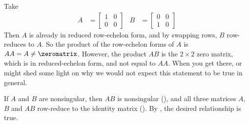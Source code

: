 Take 
%
\begin{align*}
A&=
\begin{bmatrix}
1&0\\0&0
\end{bmatrix}
&
B&=
\begin{bmatrix}
0&0\\1&0
\end{bmatrix}
\end{align*}
%
Then $A$ is already in reduced row-echelon form, and by swapping rows, $B$ row-reduces to $A$.  So the product of the row-echelon forms of $A$ is $AA=A\neq\zeromatrix$.  However, the product $AB$ is the $2\times 2$ zero matrix, which is in reduced-echelon form, and not equal to $AA$.  When you get there,  or  might shed some light on why we would not expect this statement to be true in general.\par
%
If $A$ and $B$ are nonsingular, then $AB$ is nonsingular (), and all three matrices $A$, $B$ and $AB$ row-reduce to the identity matrix ().  By , the desired relationship is true.